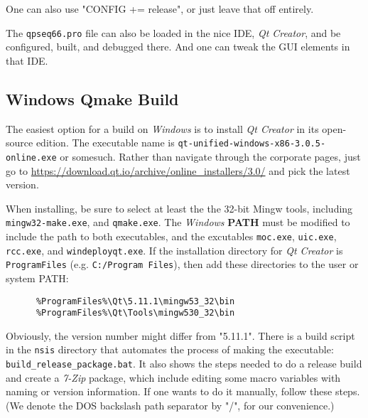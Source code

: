     One can also use "CONFIG += release", or just leave that off entirely.

    The \texttt{qpseq66.pro} file can also be loaded in the
    nice IDE, \textsl{Qt Creator}, and be configured, built, and debugged
    there.  And one can tweak the GUI elements in that IDE.

\subsection{Windows Qmake Build}
\label{subsec:build_qmake_windows}

   The easiest option for a build on \textsl{Windows} is to install 
   \textsl{Qt Creator} in its open-source edition.
   The executable name is
   \texttt{qt-unified-windows-x86-3.0.5-online.exe} or somesuch.
   Rather than navigate through the corporate pages, just go to
   \url{https://download.qt.io/archive/online_installers/3.0/} and
   pick the latest version.
   
   When installing, be sure to select at least the the 32-bit Mingw tools,
   including \texttt{mingw32-make.exe}, and
   \texttt{qmake.exe}.  The \textsl{Windows}
   \textbf{PATH} must be modified to
   include the path to both executables, and the excutables
   \texttt{moc.exe}, \texttt{uic.exe}, \texttt{rcc.exe}, and
   \texttt{windeployqt.exe}.
   If the installation directory for \textsl{Qt Creator} is
   \texttt{ProgramFiles} (e.g. \texttt{C:/Program Files}), then add
   these directories to the user or system PATH:

   \begin{verbatim}
      %ProgramFiles%\Qt\5.11.1\mingw53_32\bin
      %ProgramFiles%\Qt\Tools\mingw530_32\bin
   \end{verbatim}

   Obviously, the version number might differ from "5.11.1".
   There is a build script in the \texttt{nsis} directory that
   automates the process of making the executable:
   \texttt{build\_release\_package.bat}.
   It also shows the steps needed to do a release build and create a
   \textsl{7-Zip} package, which include editing some macro variables with
   naming or version information.  If one wants to do it manually,
   follow these steps.  (We denote the DOS backslash path separator
   by "/", for our convenience.)

